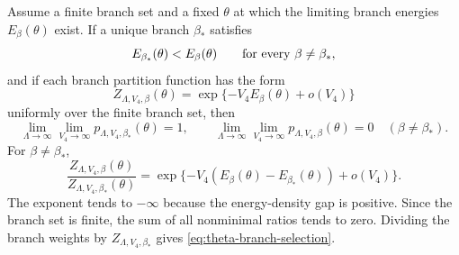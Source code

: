 \begin{remark}
\label{rem:theta-thermodynamic-branch-selection}
Assume a finite branch set and a fixed \(\theta\) at which the limiting branch
energies \(E_\beta(\theta)\) exist.  If a unique branch \(\beta_*\) satisfies
\begin{equation}
  E_{\beta_*}(\theta)
  <
  E_\beta(\theta)
  \qquad
  \hbox{for every }\beta\neq\beta_*,
  \label{eq:unique-theta-branch-minimum}
\end{equation}
and if each branch partition function has the form
\begin{equation}
  Z_{\Lambda,V_4,\beta}(\theta)
  =
  \exp\{-V_4E_\beta(\theta)+o(V_4)\}
  \label{eq:branch-free-energy-asymptotics}
\end{equation}
uniformly over the finite branch set, then
\begin{equation}
  \lim_{\Lambda\to\infty}\lim_{V_4\to\infty}
  p_{\Lambda,V_4,\beta_*}(\theta)=1,
  \qquad
  \lim_{\Lambda\to\infty}\lim_{V_4\to\infty}
  p_{\Lambda,V_4,\beta}(\theta)=0
  \quad(\beta\neq\beta_*).
  \label{eq:theta-branch-selection}
\end{equation}
For \(\beta\neq\beta_*\),
\[
  \frac{Z_{\Lambda,V_4,\beta}(\theta)}
       {Z_{\Lambda,V_4,\beta_*}(\theta)}
  =
  \exp\{-V_4(E_\beta(\theta)-E_{\beta_*}(\theta))+o(V_4)\}.
\]
The exponent tends to \(-\infty\) because the energy-density gap is positive.
Since the branch set is finite, the sum of all nonminimal ratios tends to
zero.  Dividing the branch weights by
\(Z_{\Lambda,V_4,\beta_*}\) gives
\eqref{eq:theta-branch-selection}.
\end{remark}

